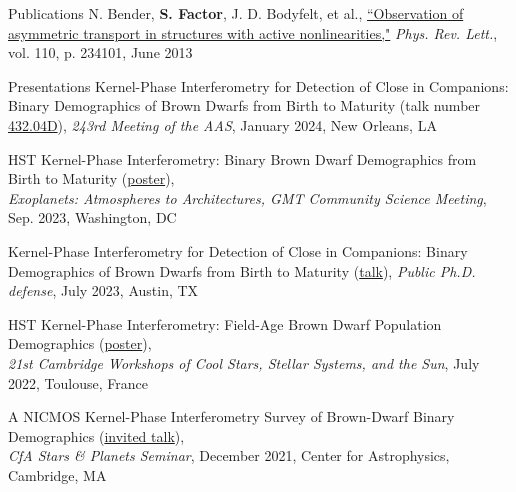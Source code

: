 \documentclass{resume} %
\begin{document}
\begin{rSection}{Publications}
    N. Bender, \textbf{S. Factor}, J. D. Bodyfelt, et al., \href{https://ui.adsabs.harvard.edu/abs/2013PhRvL.110w4101B}{``Observation of asymmetric transport in structures with active nonlinearities,"} \emph{Phys. Rev. Lett.}, vol. 110, p. 234101, June 2013
    
\end{rSection}


\begin{rSection}{Presentations} \itemsep -3pt  
    Kernel-Phase Interferometry for Detection of Close in Companions: Binary Demographics of Brown Dwarfs from Birth to Maturity (talk number \href{https://ui.adsabs.harvard.edu/abs/2024AAS...24343204F}{432.04D}), \emph{243rd Meeting of the AAS}, January 2024, New Orleans, LA
    \vspace{-0.06cm}

    HST Kernel-Phase Interferometry: Binary Brown Dwarf Demographics from Birth to Maturity (\href{https://smfactor.github.io/assets/pubs/GMTposter.pdf}{poster}),\\\emph{Exoplanets: Atmospheres to Architectures, GMT Community Science Meeting}, Sep. 2023, Washington, DC
    \vspace{-0.06cm}
    
    Kernel-Phase Interferometry for Detection of Close in Companions: Binary Demographics of Brown Dwarfs from Birth to Maturity (\href{https://youtu.be/8vgoTbuspWs}{talk}), \emph{Public Ph.D. defense}, July 2023, Austin, TX
    \vspace{-0.06cm}
    
    HST Kernel-Phase Interferometry: Field-Age Brown Dwarf Population Demographics (\href{https://zenodo.org/record/7592115}{poster}),\\\emph{21st Cambridge Workshops of Cool Stars, Stellar Systems, and the Sun}, July 2022, Toulouse, France
    \vspace{-0.06cm}

    A NICMOS Kernel-Phase Interferometry Survey of Brown-Dwarf Binary Demographics (\href{https://www.cfa.harvard.edu/calendar/event/9287/}{invited talk}),\\\emph{CfA Stars \& Planets Seminar}, December 2021, Center for Astrophysics, Cambridge, MA
    \vspace{-0.06cm}
    

\end{rSection}
\end{document}
